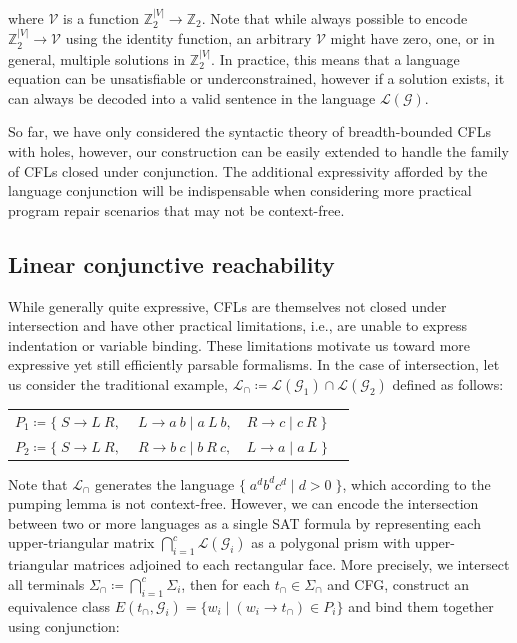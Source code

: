 \documentclass[sigplan,review,anonymous,acmsmall]{acmart}\settopmatter{printfolios=false,printccs=false,printacmref=false}
\begin{document}
\noindent where $\mathcal{V}$ is a function $\mathbb{Z}_2^{|V|}\rightarrow\mathbb{Z}_2$. Note that while always possible to encode $\mathbb{Z}_2^{|V|} \rightarrow \mathcal{V}$ using the identity function, an arbitrary $\mathcal{V}$ might have zero, one, or in general, multiple solutions in $\mathbb{Z}_2^{|V|}$. In practice, this means that a language equation can be unsatisfiable or underconstrained, however if a solution exists, it can always be decoded into a valid sentence in the language $\mathcal{L}(\mathcal{G})$.

So far, we have only considered the syntactic theory of breadth-bounded CFLs with holes, however, our construction can be easily extended to handle the family of CFLs closed under conjunction. The additional expressivity afforded by the language conjunction will be indispensable when considering more practical program repair scenarios that may not be context-free.

\subsection{Linear conjunctive reachability}\label{sec:lclreach}

While generally quite expressive, CFLs are themselves not closed under intersection and have other practical limitations, i.e., are unable to express indentation or variable binding. These limitations motivate us toward more expressive yet still efficiently parsable formalisms. In the case of intersection, let us consider the traditional example, $\mathcal{L}_\cap \coloneqq \mathcal{L}(\mathcal{G}_1) \cap \mathcal{L}(\mathcal{G}_2)$ defined as follows:

\begin{table}[H]
  \begin{tabular}{llll}
    $P_1 \coloneqq \big\{\;S \rightarrow L\:R,$ & $\:L \rightarrow a\:b \mid a\:L\:b,$ & $R \rightarrow c \mid c \:R\;\big\}$\vspace{5pt}\\
    $P_2 \coloneqq \big\{\;S \rightarrow L\:R,$ & $\:R \rightarrow b\:c \mid b\:R\:c,$ & $L \rightarrow a \mid a \:L\;\big\}$
  \end{tabular}
\end{table}

\noindent Note that $\mathcal{L}_\cap$ generates the language $\big\{\;a^d b^d c^d \mid d > 0\;\big\}$, which according to the pumping lemma is not context-free. However, we can encode the intersection between two or more languages as a single SAT formula by representing  each upper-triangular matrix $\bigcap_{i=1}^c \mathcal{L}(\mathcal{G}_i)$ as a polygonal prism with upper-triangular matrices adjoined to each rectangular face. More precisely, we intersect all terminals $\Sigma_\cap \coloneqq \bigcap_{i=1}^c \Sigma_i$, then for each $t_\cap \in \Sigma_\cap$ and CFG, construct an equivalence class $E(t_\cap, \mathcal{G}_i) = \{ w_i \mid (w_i \rightarrow t_\cap) \in P_i\}$ and bind them together using conjunction:\vspace{-5pt}
\end{document}
